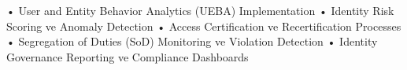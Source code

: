 • User and Entity Behavior Analytics (UEBA) Implementation
• Identity Risk Scoring ve Anomaly Detection
• Access Certification ve Recertification Processes
• Segregation of Duties (SoD) Monitoring ve Violation Detection
• Identity Governance Reporting ve Compliance Dashboards